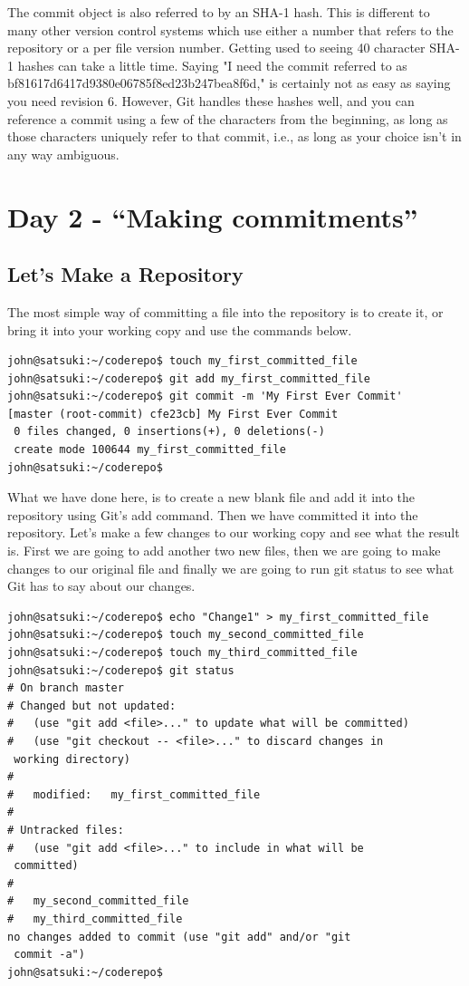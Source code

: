 The commit object is also referred to by an SHA-1 hash.  This is different to many other version control systems which use either a number that refers to the repository or a per file version number.  Getting used to seeing 40 character SHA-1 hashes can take a little time.  Saying "I need the commit referred to as  bf81617d6417d9380e06785f8ed23b247bea8f6d," is certainly not as easy as saying you need revision 6.  However, Git handles these hashes well, and you can reference a commit using a few of the characters from the beginning, as long as those characters uniquely refer to that commit, i.e., as long as your choice isn't in any way ambiguous.

\section{Day 2 - ``Making commitments''}
\subsection{Let's Make a Repository}

The most simple way of committing a file into the repository is to create it, or bring it into your working copy and use the commands below.

\begin{Verbatim}[frame=leftline,framerule=1mm,fontsize=\relsize{-3}] 
john@satsuki:~/coderepo$ touch my_first_committed_file
john@satsuki:~/coderepo$ git add my_first_committed_file
john@satsuki:~/coderepo$ git commit -m 'My First Ever Commit'
[master (root-commit) cfe23cb] My First Ever Commit
 0 files changed, 0 insertions(+), 0 deletions(-)
 create mode 100644 my_first_committed_file
john@satsuki:~/coderepo$ 
\end{Verbatim} 

What we have done here, is to create a new blank file and add it into the repository using Git's add command.  Then we have committed it into the repository.  Let's make a few changes to our working copy and see what the result is.  First we are going to add another two new files, then we are going to make changes to our original file and finally we are going to run git status to see what Git has to say about our changes.

\begin{Verbatim}[frame=leftline,framerule=1mm,fontsize=\relsize{-3}] 
john@satsuki:~/coderepo$ echo "Change1" > my_first_committed_file
john@satsuki:~/coderepo$ touch my_second_committed_file
john@satsuki:~/coderepo$ touch my_third_committed_file
john@satsuki:~/coderepo$ git status
# On branch master
# Changed but not updated:
#   (use "git add <file>..." to update what will be committed)
#   (use "git checkout -- <file>..." to discard changes in 
 working directory)
#
#	modified:   my_first_committed_file
#
# Untracked files:
#   (use "git add <file>..." to include in what will be 
 committed)
#
#	my_second_committed_file
#	my_third_committed_file
no changes added to commit (use "git add" and/or "git 
 commit -a")
john@satsuki:~/coderepo$ 
\end{Verbatim} 

